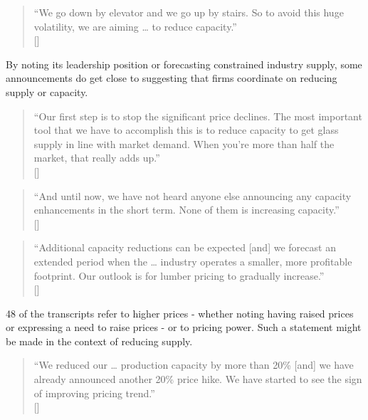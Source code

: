 \begin{quote}
``We go down by elevator and we go up by stairs. So to avoid this huge volatility, we are aiming … to reduce capacity.'' \\
\mbox{[]}
\end{quote}

By noting its leadership position or forecasting constrained industry supply, some announcements do get close to suggesting that firms coordinate on reducing supply or capacity.

\begin{quote}
``Our first step is to stop the significant price declines. The most important tool that we have to accomplish this is to reduce capacity to get glass supply in line with market demand. When you're more than half the market, that really adds up.'' \\
\mbox{[]}
\end{quote}

\begin{quote}
``And until now, we have not heard anyone else announcing any capacity enhancements in the short term. None of them is increasing capacity.'' \\
\mbox{[]}
\end{quote}

\begin{quote}
``Additional capacity reductions can be expected [and] we forecast an extended period when the … industry operates a smaller, more profitable footprint. Our outlook is for lumber pricing to gradually increase.'' \\
\mbox{[]}
\end{quote}

48 of the transcripts refer to higher prices - whether noting having raised prices or expressing a need to raise prices - or to pricing power. Such a statement might be made in the context of reducing supply.

\begin{quote}
``We reduced our … production capacity by more than 20\% [and] we have already announced another 20\% price hike. We have started to see the sign of improving pricing trend.'' \\
\mbox{[]}
\end{quote}

